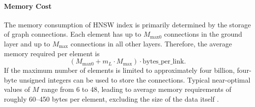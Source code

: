 \paragraph{Memory Cost}

The memory consumption of HNSW index is primarily determined by the storage of graph connections. Each element has up to $M_{\text{max0}}$ connections in the ground layer and up to $M_{\text{max}}$ connections in all other layers. Therefore, the average memory required per element is 
\[
(M_{\text{max0}} + m_L \cdot M_{\text{max}}) \cdot \text{bytes\_per\_link}.
\]
If the maximum number of elements is limited to approximately four billion, four-byte unsigned integers can be used to store the connections. Typical near-optimal values of $M$ range from 6 to 48, leading to average memory requirements of roughly 60–450 bytes per element, excluding the size of the data itself \cite{Malkov-Yashunin-2016}.